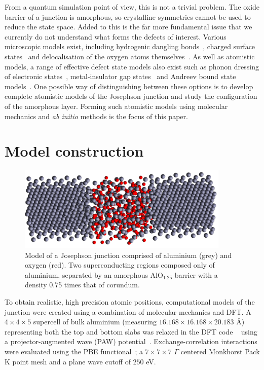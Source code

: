 From a quantum simulation point of view, this is not a trivial problem.
The oxide barrier of a junction is amorphous, so crystalline symmetries cannot be used to reduce the state space.
Added to this is the far more fundamental issue that we currently do not understand what forms the defects of interest.
Various microscopic models exist, including hydrogenic dangling bonds~\cite{Martinis2005,Jameson2011,Holder2013, Gordon2014}, charged surface states~\cite{Choi2009, Lee2014} and delocalisation of the oxygen atoms themselves~\cite{DuBois2013, DuBois2015}.
As well as atomistic models, a range of effective defect state models also exist such as phonon dressing of electronic states~\cite{Agarwal2013}, metal-insulator gap states~\cite{Choi2009} and Andreev bound state models~\cite{DeSousa2009}.
One possible way of distinguishing between these options is to develop complete atomistic models of the Josephson junction and study the configuration of the amorphous layer.
Forming such atomistic models using molecular mechanics and \textit{ab initio} methods is the focus of this paper.


\section{Model construction}\label{sec:model}
\begin{figure}[htp]
\includegraphics[width=0.9\textwidth]{figures/AlO125_075}
\caption[Atomistic Josephson Junction Model]{\label{fig:povray}Model of a Josephson junction comprised of aluminium (grey) and oxygen (red). Two superconducting regions composed only of aluminium, separated by an amorphous AlO$_{1.25}$ barrier with a density 0.75 times that of corundum.}%
\end{figure}
To obtain realistic, high precision atomic positions, computational models of the junction were created using a combination of molecular mechanics and DFT. 
A $4\!\times\!4\!\times\!5$ supercell of bulk aluminium (measuring $16.168\times16.168\times20.183$ \AA) representing both the top and bottom slabs was relaxed in the DFT code ~\cite{Kresse1994, Kresse1996, Kresse1996a} using a projector-augmented wave (PAW) potential~\cite{Kresse1999, Blochl1994}.
Exchange-correlation interactions were evaluated using the PBE functional~\cite{Perdew1996}; a $7\!\times\!7\!\times\!7$ $\Gamma$ centered Monkhorst Pack K point mesh and a plane wave cutoff of $250$ eV.

